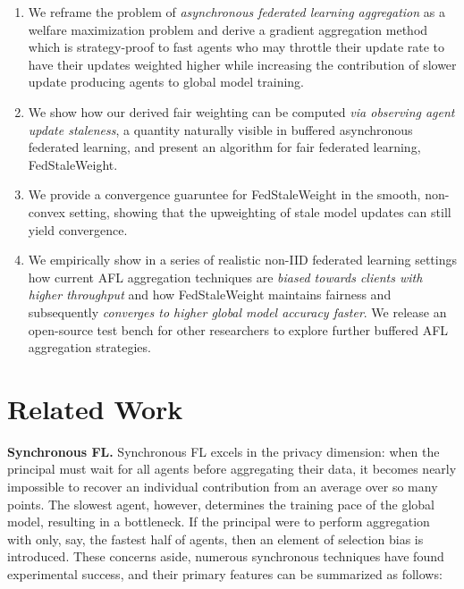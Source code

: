 \documentclass{article}
\begin{document}
\begin{enumerate}[leftmargin=2em]
    \item We reframe the problem of \emph{asynchronous federated learning aggregation} as a welfare maximization problem and derive a gradient aggregation method which is strategy-proof to fast agents who may throttle their update rate to have their updates weighted higher while increasing the contribution of slower update producing agents to global model training.
    \item We show how our derived fair weighting can be computed \emph{via observing agent update staleness}, a quantity naturally visible in buffered asynchronous federated learning, and present an algorithm for fair federated learning, FedStaleWeight.
    \item We provide a convergence guaruntee for FedStaleWeight in the smooth, non-convex setting, showing that the upweighting of stale model updates can still yield convergence.
    \item We empirically show in a series of realistic non-IID federated learning settings how current AFL aggregation techniques are \emph{biased towards clients with higher throughput} and how FedStaleWeight maintains fairness and subsequently \emph{converges to higher global model accuracy faster}. We release an open-source test bench for other researchers to explore further buffered AFL aggregation strategies.
\end{enumerate}

\section{Related Work}

{\bf Synchronous FL.} Synchronous FL excels in the privacy dimension: when the principal must wait for all agents before aggregating their data, it becomes nearly impossible to recover an individual contribution from an average over so many points. The slowest agent, however, determines the training pace of the global model, resulting in a bottleneck. If the principal were to perform aggregation with only, say, the fastest half of agents, then an element of selection bias is introduced. These concerns aside, numerous synchronous techniques have found experimental success, and their primary features can be summarized as follows:
\end{document}
